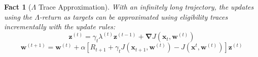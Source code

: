 \documentclass{article}
\newtheorem{fact}{Fact}[section]
\begin{document}

\begin{fact}[$\Lambda$ Trace Approximation]
With an infinitely long trajectory, the updates using the $\Lambda$-return as targets can be approximated using eligibility traces incrementally with the update rules:
$$\bm{z}^{(t)} = \gamma_t \lambda^{(t)} \bm{z}^{(t-1)} + \bm{\nabla} J(\bm{x}_{t}, \bm{w}^{(t)})$$
$$\bm{w}^{(t+1)} = \bm{w}^{(t)} + \alpha [R_{t+1} + \gamma_t J(\bm{x}_{t+1}, \bm{w}^{(t)}) - J(\bm{x}^{t}, \bm{w}^{(t)})] \bm{z}^{(t)}$$
\end{fact}
\end{document}
